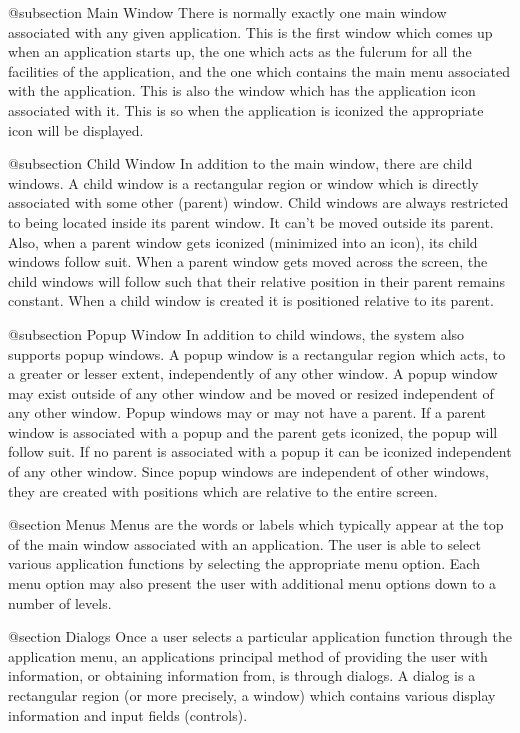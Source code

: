 @subsection Main Window
There is normally exactly one main window associated with any given
application.  This is the first window which comes up when an application
starts up, the one which acts as the fulcrum for all the facilities of
the application, and the one which contains the main menu associated with
the application.  This is also the window which has the application icon
associated with it.  This is so when the application is iconized the
appropriate icon will be displayed.

@subsection Child Window
In addition to the main window, there are child windows.  A child window
is a rectangular region or window which is directly associated with
some other (parent) window.  Child windows are always restricted to being
located inside its parent window.  It can't be moved outside its parent.
Also, when a parent window gets iconized (minimized into an icon), its
child windows follow suit.  When a parent window gets moved across the
screen, the child windows will follow such that their relative position
in their parent remains constant.  When a child window is created it
is positioned relative to its parent.  

@subsection Popup Window
In addition to child windows, the system also supports popup windows.  A
popup window is a rectangular region which acts, to a greater or lesser
extent, independently of any other window.  A popup window may exist
outside of any other window and be moved or resized independent of any
other window.  Popup windows may or may not have a parent.  If a parent
window is associated with a popup and the parent gets iconized, the
popup will follow suit.  If no parent is associated with a popup it can
be iconized independent of any other window.  Since popup windows are
independent of other windows, they are created with positions which are
relative to the entire screen.

@section Menus
Menus are the words or labels which typically appear at the top of the
main window associated with an application.  The user is able to select
various application functions by selecting the appropriate menu option.
Each menu option may also present the user with additional menu options
down to a number of levels.

@section Dialogs
Once a user selects a particular application function through the
application menu, an applications principal method of providing the user
with information, or obtaining information from, is through dialogs.  A
dialog is a rectangular region (or more precisely, a window) which
contains various display information and input fields (controls).


